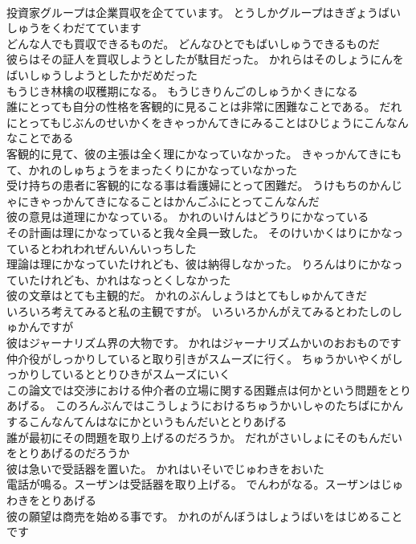\documentclass[8pt]{extreport}
\begin{document}
\begin{CJK}{UTF8}{min}
\\	投資家グループは企業買収を企てています。	とうしかグループはきぎょうばいしゅうをくわだてています 
\\	どんな人でも買収できるものだ。	どんなひとでもばいしゅうできるものだ 
\\	彼らはその証人を買収しようとしたが駄目だった。	かれらはそのしょうにんをばいしゅうしようとしたかだめだった 
\\	もうじき林檎の収穫期になる。	もうじきりんごのしゅうかくきになる 
\\	誰にとっても自分の性格を客観的に見ることは非常に困難なことである。	だれにとってもじぶんのせいかくをきゃっかんてきにみることはひじょうにこんなんなことである 
\\	客観的に見て、彼の主張は全く理にかなっていなかった。	きゃっかんてきにもて、かれのしゅちょうをまったくりにかなっていなかった 
\\	受け持ちの患者に客観的になる事は看護婦にとって困難だ。	うけもちのかんじゃにきゃっかんてきになることはかんごふにとってこんなんだ 
\\	彼の意見は道理にかなっている。	かれのいけんはどうりにかなっている 
\\	その計画は理にかなっていると我々全員一致した。	そのけいかくはりにかなっているとわれわれぜんいんいっちした 
\\	理論は理にかなっていたけれども、彼は納得しなかった。	りろんはりにかなっていたけれども、かれはなっとくしなかった 
\\	彼の文章はとても主観的だ。	かれのぶんしょうはとてもしゅかんてきだ 
\\	いろいろ考えてみると私の主観ですが。	いろいろかんがえてみるとわたしのしゅかんですが 
\\	彼はジャーナリズム界の大物です。	かれはジャーナリズムかいのおおものです 
\\	仲介役がしっかりしていると取り引きがスムーズに行く。	ちゅうかいやくがしっかりしているととりひきがスムーズにいく 
\\	この論文では交渉における仲介者の立場に関する困難点は何かという問題をとりあげる。	このろんぶんではこうしょうにおけるちゅうかいしゃのたちばにかんするこんなんてんはなにかというもんだいととりあげる 
\\	誰が最初にその問題を取り上げるのだろうか。	だれがさいしょにそのもんだいをとりあげるのだろうか 
\\	彼は急いで受話器を置いた。	かれはいそいでじゅわきをおいた 
\\	電話が鳴る。スーザンは受話器を取り上げる。	でんわがなる。スーザンはじゅわきをとりあげる 
\\	彼の願望は商売を始める事です。	かれのがんぼうはしょうばいをはじめることです 

\end{CJK}
\end{document}
